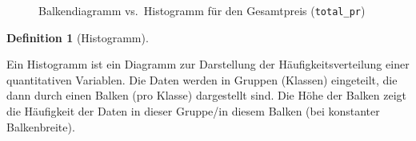 \documentclass[
  letterpaper,
]{scrbook}
\theoremstyle{definition}
\theoremstyle{definition}
\newtheorem{definition}{Definition}[chapter]
\theoremstyle{definition}
\theoremstyle{remark}
\begin{document}
\begin{figure}

\begin{minipage}{0.50\linewidth}



\end{minipage}%
%
\begin{minipage}{0.50\linewidth}



\end{minipage}%

\caption{\label{fig-balken-hist}Balkendiagramm vs.~Histogramm für den
Gesamtpreis (\texttt{total\_pr})}

\end{figure}%

\begin{definition}[Histogramm]\protect\hypertarget{def-histogramm}{}\label{def-histogramm}

Ein Histogramm ist ein Diagramm zur Darstellung der
Häufigkeitsverteilung einer quantitativen Variablen. Die Daten werden in
Gruppen (Klassen) eingeteilt, die dann durch einen Balken (pro Klasse)
dargestellt sind. Die Höhe der Balken zeigt die Häufigkeit der Daten in
dieser Gruppe/in diesem Balken (bei konstanter Balkenbreite).

\end{definition}
\end{document}
